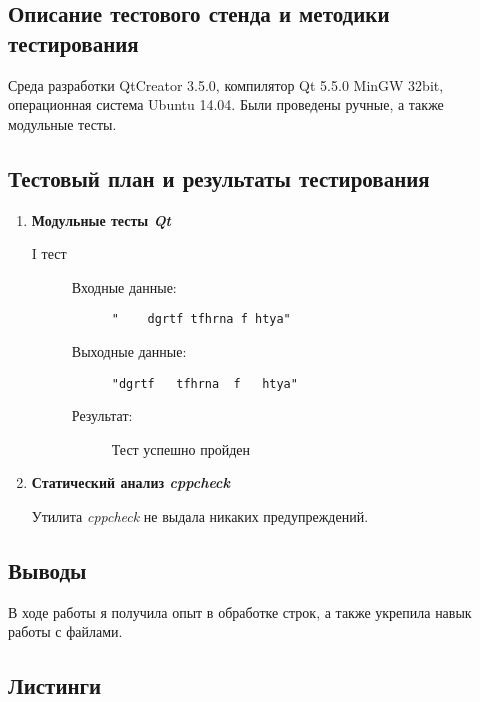 \documentclass[12pt,a4paper]{report}
\begin{document}
\subsection{Описание тестового стенда и методики тестирования}
Среда разработки QtCreator 3.5.0, компилятор Qt 5.5.0 MinGW 32bit, операционная система Ubuntu 14.04. Были проведены ручные, а также модульные тесты.

\subsection{Тестовый план и результаты тестирования}
\hspace{\parindent}
\begin{enumerate}
\item \textbf{Модульные тесты \textit{Qt}}

\begin{description}
\item[I тест]
\hspace{\parindent}
\begin{flushleft}
\begin{description}
\item[Входные данные:] \verb-"    dgrtf tfhrna f htya"- 


\item[Выходные данные:] \verb-"dgrtf   tfhrna  f   htya"-

\item[Результат:] Тест успешно пройден
\end{description}
\end{flushleft}
\end{description}

\item \textbf{Статический анализ \textit{cppcheck}}

Утилита \textit{cppcheck} не выдала никаких предупреждений.
\end{enumerate}

\subsection{Выводы}
\hspace{\parindent}
В ходе работы я получила опыт в обработке строк, а также укрепила навык работы с файлами.
\subsection*{Листинги}
\end{document}
